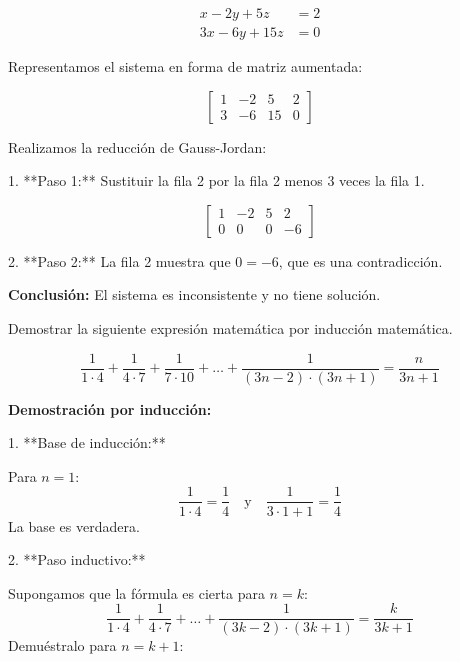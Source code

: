 \documentclass[answers]{exam}
\begin{document}
\begin{questions}
\begin{solution}
        \[
        \begin{aligned}
        x - 2y + 5z &= 2 \\
        3x - 6y + 15z &= 0
        \end{aligned}
        \]
        
        Representamos el sistema en forma de matriz aumentada:
        
        \[
        \left[\begin{array}{ccc|c}
        1 & -2 & 5 & 2 \\
        3 & -6 & 15 & 0
        \end{array}\right]
        \]
        
        Realizamos la reducción de Gauss-Jordan:
        
        1. **Paso 1:** Sustituir la fila 2 por la fila 2 menos 3 veces la fila 1.
        
        \[
        \left[\begin{array}{ccc|c}
        1 & -2 & 5 & 2 \\
        0 & 0 & 0 & -6
        \end{array}\right]
        \]
        
        2. **Paso 2:** La fila 2 muestra que \(0 = -6\), que es una contradicción.
        
        \textbf{Conclusión:} El sistema es inconsistente y no tiene solución. 
        \end{solution}
        
        

    \question Demostrar la siguiente expresión matemática por inducción matemática.

    \[
        \frac{1}{1 \cdot 4} + \frac{1}{4 \cdot 7} + \frac{1}{7 \cdot 10} + \ldots + \frac{1}{(3n-2)\cdot(3n+1)} = \frac{n}{3n+1}
    \]
    \begin{solution}
        \textbf{Demostración por inducción:}
        
        1. **Base de inducción:**
        
        Para \(n = 1\):
        \[
        \frac{1}{1 \cdot 4} = \frac{1}{4} \quad \text{y} \quad \frac{1}{3 \cdot 1 + 1} = \frac{1}{4}
        \]
        La base es verdadera.
        
        2. **Paso inductivo:**
        
        Supongamos que la fórmula es cierta para \(n = k\):
        \[
        \frac{1}{1 \cdot 4} + \frac{1}{4 \cdot 7} + \dots + \frac{1}{(3k-2)\cdot(3k+1)} = \frac{k}{3k+1}
        \]
        Demuéstralo para \(n = k+1\):
        

\end{solution}
\end{questions}
\end{document}
